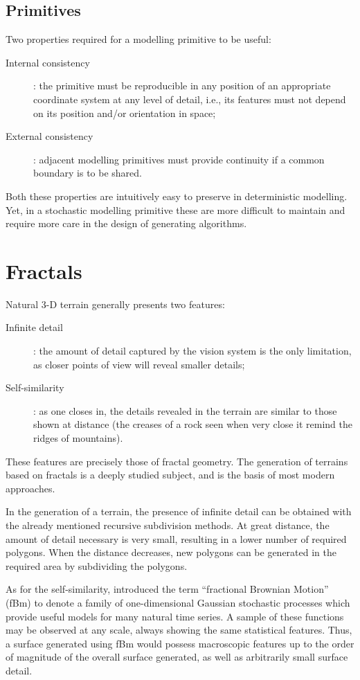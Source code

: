 \documentclass{acmtog}
\begin{document}
\subsection{Primitives}
Two properties required for a modelling primitive to be useful:
\begin{description}
\item[Internal consistency]{: the primitive must be reproducible in any position of an appropriate coordinate system at any level of detail, i.e., its features must not depend on its position and/or orientation in space;}
\item[External consistency]{: adjacent modelling primitives must provide continuity if a common boundary is to be shared.}
\end{description}

Both these properties are intuitively easy to preserve in deterministic modelling. Yet, in a stochastic modelling primitive these are more difficult to maintain and require more care in the design of generating algorithms.

\section{Fractals}
Natural 3-D terrain generally presents two features:
\begin{description}
\item[Infinite detail]{: the amount of detail captured by the vision system is the only limitation, as closer points of view will reveal smaller details;}
\item[Self-similarity]{: as one closes in, the details revealed in the terrain are similar to those shown at distance (the creases of a rock seen when very close it remind the ridges of mountains).}
\end{description}

These features are precisely those of fractal geometry. The generation of terrains based on fractals is a deeply studied subject, and is the basis of most modern approaches.

In the generation of a terrain, the presence of infinite detail can be obtained with the already mentioned recursive subdivision methods. At great distance, the amount of detail necessary is very small, resulting in a lower number of required polygons. When the distance decreases, new polygons can be generated in the required area by subdividing the polygons.

As for the self-similarity, \cite{MandelbrotVanNess1968} introduced the term ``fractional Brownian Motion'' (fBm) to denote a family of one-dimensional Gaussian stochastic processes which provide useful models for many natural time series. A sample of these functions may be observed at any scale, always showing the same statistical features. Thus, a surface generated using fBm would possess macroscopic features up to the order of magnitude of the overall surface generated, as well as arbitrarily small surface detail.
\end{document}
